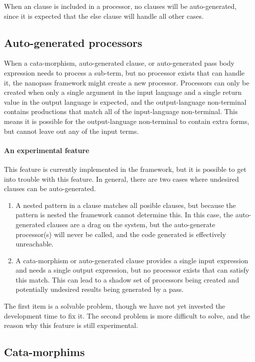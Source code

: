 \documentclass[letterpaper,10pt]{article}
\begin{document}
When an  clause is included in a processor, no clauses will be
auto-generated, since it is expected that the else clause will handle all other
cases.

\subsection{Auto-generated processors}

When a cata-morphism, auto-generated clause, or auto-generated pass body
expression needs to process a sub-term, but no processor exists that can handle
it, the nanopass framework might create a new processor.
Processors can only be created when only a single argument in the input
language and a single return value in the output language is expected, and the
output-language non-terminal contains productions that match all of the
input-language non-terminal.
This means it is possible for the output-language non-terminal to contain extra
forms, but cannot leave out any of the input terms.

\paragraph{An experimental feature}
This feature is currently implemented in the framework, but it is possible to
get into trouble with this feature.
In general, there are two cases where undesired clauses can be auto-generated.
\begin{enumerate}
\item A nested pattern in a clause matches all posible clauses, but because the
pattern is nested the framework cannot determine this.
In this case, the
auto-generated clauses are a drag on the system, but the auto-generate
processor(s) will never be called, and the code generated is effectively
unreachable.
\item A cata-morphism or auto-generated clause provides a single input expression
and needs a single output expression, but no processor exists that can satisfy
this match.  This can lead to a shadow set of processors being created and
potentially undesired results being generated by a pass.
\end{enumerate}

The first item is a solvable problem, though we have not yet invested the
development time to fix it.  The second problem is more difficult to solve, and
the reason why this feature is still experimental.

\subsection{Cata-morphims}
\end{document}
